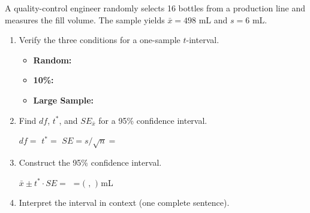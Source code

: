 \documentclass[10pt]{article}
\begin{document}
\namedateperiod

\vspace{0.1in}
A quality-control engineer randomly selects 16 bottles from a production line and
measures the fill volume. The sample yields $\bar x = 498$ mL and $s = 6$ mL.

\begin{enumerate}

  \item Verify the three conditions for a one-sample $t$-interval.
        \begin{itemize}
            \item \textbf{Random:} \blank{6cm}
            \item \textbf{10\%:} \blank{6cm}
            \item \textbf{Large Sample:} \blank{6cm}
        \end{itemize}

  \item Find $df$, $t^*$, and $SE_{\bar x}$ for a 95\% confidence interval.

        $df = $ \blank{2cm} \quad $t^* = $ \blank{2.5cm} \quad
        $SE = s/\sqrt{n} = $ \blank{3cm}

  \item Construct the 95\% confidence interval.

        $\bar x \pm t^* \cdot SE = $ \blank{8cm} $= ($ \blank{2cm} $,$ \blank{2cm} $)$ mL

  \item Interpret the interval in context (one complete sentence).


\end{enumerate}
\end{document}
